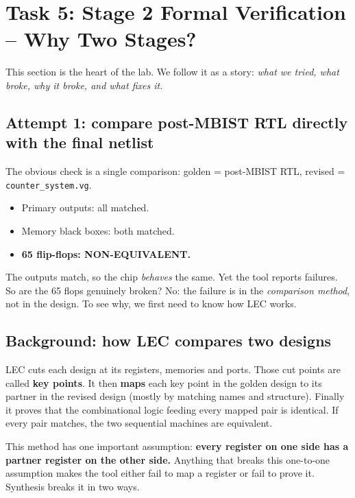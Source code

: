 \documentclass[11pt]{article}
\newcommand{\code}[1]{\texttt{\small #1}}
\begin{document}
\section{Task 5: Stage 2 Formal Verification -- Why Two Stages?}
\label{sec:two-stage}

This section is the heart of the lab. We follow it as a story: \emph{what we tried, what broke, why it broke, and what fixes it.}

\subsection{Attempt 1: compare post-MBIST RTL directly with the final netlist}

The obvious check is a single comparison: golden = post-MBIST RTL, revised = \code{counter\_system.vg}.

\begin{probbox}
\begin{itemize}
  \item Primary outputs: all matched.
  \item Memory black boxes: both matched.
  \item \textbf{65 flip-flops: NON-EQUIVALENT.}
\end{itemize}
\end{probbox}

The outputs match, so the chip \emph{behaves} the same. Yet the tool reports failures. So are the 65 flops genuinely broken?
No: the failure is in the \emph{comparison method}, not in the design. To see why, we first need to know how LEC works.

\subsection{Background: how LEC compares two designs}

\begin{keybox}
LEC cuts each design at its registers, memories and ports. Those cut points are called \textbf{key points}. It then \textbf{maps} each key point in the golden design to its
partner in the revised design (mostly by matching names and structure). Finally it proves that the combinational logic
feeding every mapped pair is identical. If every pair matches, the two sequential machines are equivalent.
\end{keybox}

This method has one important assumption: \textbf{every register on one side has a partner register on the other side.}
Anything that breaks this one-to-one assumption makes the tool either fail to map a register or fail to prove it.
Synthesis breaks it in two ways.
\end{document}
